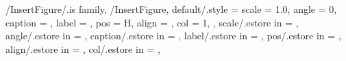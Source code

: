 
\usepackage{ifthen}
\usepackage{xparse}

%
%
%

{
  {}
  {}
} %

{
  {}
  {}
} %


\pgfkeys
{
  /InsertFigure/.is family, /InsertFigure,
  default/.style =
  {
    scale = 1.0,
    angle = 0,
    caption = \empty,
    label = \empty,
    pos = {H},      %
    align = \empty, %
    col = 1,        %
  },
  scale/.estore in = \TmpValueScale,
  angle/.estore in = \TmpValueAngle,
  caption/.estore in = \TmpValueCaption,
  label/.estore in = \TmpValueLabel,
  pos/.estore in = \TmpValuePosition,   %
  align/.estore in = \TmpValueAlign,    %
  col/.estore in = \TmpValueColumn,     %
} %

\newcommand{\InsertFigure}[2][\empty]
{
  \pgfkeys{/InsertFigure, default, #1}%
  \begin{figure}[H]%
  \colorbox{white}{
    \begin{minipage}{\textwidth}{%
      \makebox[\textwidth]{%
      \texttt{[image: \#2]}%
      }}%
      \SetImageCaption{\TmpValueCaption}%
      \ifthenelse{\equal{\TmpValueCaption}{\empty}} %
        {}{\SetImageLabel{\TmpValueLabel}}%
    \end{minipage}%
  }%
  \end{figure}%
} %


\newcommand{\InsertCenterImage}[2][\empty]
{
  \InsertFigure[#1]{#2}%
} %

\newcommand{\InsertImage}[2][\empty]
{
  \InsertFigure[#1]{#2}%
} %

